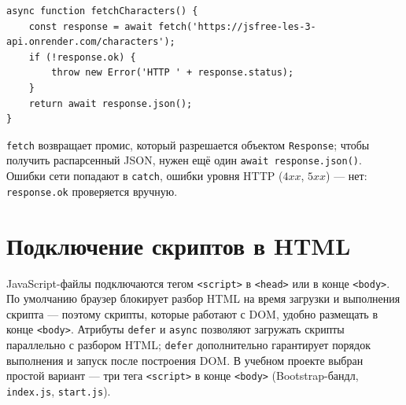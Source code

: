 \begin{lstlisting}[caption={Асинхронный запрос с обработкой ошибки},captionpos=b]
async function fetchCharacters() {
    const response = await fetch('https://jsfree-les-3-api.onrender.com/characters');
    if (!response.ok) {
        throw new Error('HTTP ' + response.status);
    }
    return await response.json();
}
\end{lstlisting}

\texttt{fetch} возвращает промис, который разрешается объектом
\texttt{Response}; чтобы получить распарсенный JSON, нужен ещё один
\texttt{await response.json()}. Ошибки сети попадают в
\texttt{catch}, ошибки уровня HTTP (\(4xx\), \(5xx\)) --- нет:
\texttt{response.ok} проверяется вручную.

\section{Подключение скриптов в HTML}

JavaScript-файлы подключаются тегом \texttt{<script>} в \texttt{<head>}
или в конце \texttt{<body>}. По умолчанию браузер блокирует разбор
HTML на время загрузки и выполнения скрипта --- поэтому скрипты,
которые работают с DOM, удобно размещать в конце \texttt{<body>}.
Атрибуты \texttt{defer} и \texttt{async} позволяют загружать скрипты
параллельно с разбором HTML; \texttt{defer} дополнительно гарантирует
порядок выполнения и запуск после построения DOM. В учебном проекте
выбран простой вариант --- три тега \texttt{<script>} в конце
\texttt{<body>} (Bootstrap-бандл, \texttt{index.js}, \texttt{start.js}).

\endinput
